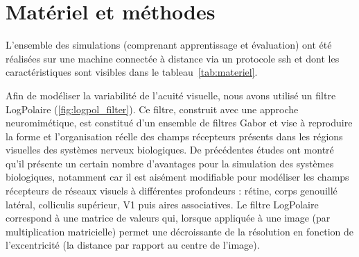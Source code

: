 
\chapter{Matériel et méthodes} %
\label{Materiel_methode} %


L'ensemble des simulations (comprenant apprentissage et évaluation) ont été réalisées sur une machine connectée à distance via un protocole ssh et dont les caractéristiques sont visibles dans le tableau~\autoref{tab:materiel}.	


Afin de modéliser la variabilité de l'acuité visuelle, nous avons utilisé un filtre LogPolaire (\ref{fig:logpol_filter}).
Ce filtre, construit avec une approche neuromimétique, est constitué d'un ensemble de filtres Gabor et vise à reproduire la forme et l'organisation réelle des champs récepteurs présents dans les régions visuelles des systèmes nerveux biologiques. De précédentes études ont montré qu'il présente un certain nombre d'avantages pour la simulation des systèmes biologiques, notamment car il est aisément modifiable pour modéliser les champs récepteurs de réseaux visuels à différentes profondeurs : rétine, corps genouillé latéral, colliculis supérieur, V1 puis aires associatives.
Le filtre LogPolaire correspond à une matrice de valeurs qui, lorsque appliquée à une image (par multiplication matricielle) permet une décroissante de la résolution en fonction de l'excentricité (la distance par rapport au centre de l'image). \autocite{Freeman2011} \\



